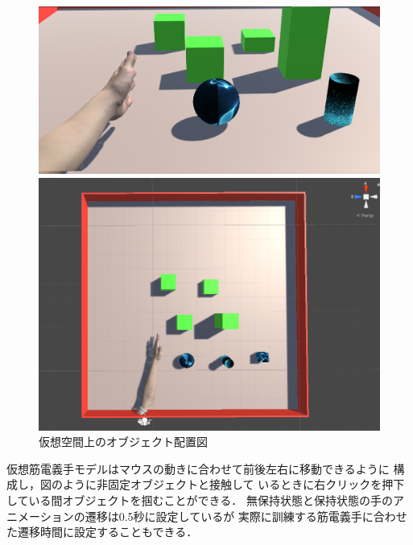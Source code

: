 \documentclass{ltjsarticle}
\begin{document}
		\begin{figure}[H]
		\centering
		\begin{minipage}{0.52\columnwidth}
		\centering
		\includegraphics[width = \columnwidth]{figs/gamescreen.png}
		\end{minipage}
		\hspace{0.05\columnwidth}
		\begin{minipage}{0.4\columnwidth}
		\centering
		\includegraphics[width = \columnwidth]{figs/fieldup.png}
		\end{minipage}
		\caption{仮想空間上のオブジェクト配置図}
		\label{fig:gamefield}
		\end{figure}
		\vspace{-20pt}

		
		仮想筋電義手モデルはマウスの動きに合わせて前後左右に移動できるように
		構成し，図のように非固定オブジェクトと接触して
		いるときに右クリックを押下している間オブジェクトを掴むことができる．
		無保持状態と保持状態の手のアニメーションの遷移は0.5秒に設定しているが
		実際に訓練する筋電義手に合わせた遷移時間に設定することもできる．
\end{document}
